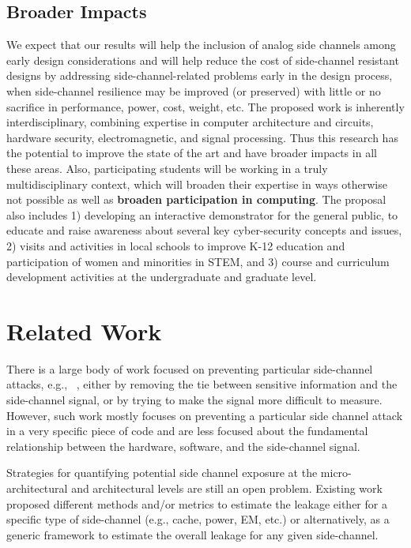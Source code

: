 \documentclass[11 pt]{article}
\begin{document}
\subsection{Broader Impacts}
We expect that our results will help the inclusion of analog side channels among early design considerations and will help reduce the cost of side-channel resistant designs by addressing side-channel-related problems early in the design process, when side-channel resilience may be improved (or preserved) with little or no sacrifice in performance, power, cost, weight, etc. The proposed work is inherently interdisciplinary, combining expertise in computer architecture and circuits, hardware security, electromagnetic, and signal processing. Thus this research has the potential to improve the state of the art and have broader impacts in all these areas. Also, participating students will be working in a truly multidisciplinary context, which will broaden their expertise in ways otherwise not possible as well as {\bf broaden participation in computing}. The proposal also includes 1) developing an interactive demonstrator for the general public, to educate and raise awareness about several key cyber-security concepts and issues, 2) visits and activities in local schools to improve K-12 education and participation of women and minorities in STEM, and 3) course and curriculum development activities at the undergraduate and graduate level.
\section{Related Work}
There is a large body of work focused on preventing particular side-channel attacks, e.g., ~\cite{Backes:2010:ASA:1929820.1929847,Nazari:2017:EED:3079856.3080223,Demme:2013:FOM:2485922.2485970,Han:2017:WMB:3133956.3134081,Liu:2016:CET:2976749.2978299,6987331,He:2017:SYC:3123939.3124546,217605,Monjur21}, either by removing the tie between sensitive information and the side-channel signal, or by
trying to make the signal more difficult to measure. However, such work mostly focuses on preventing a particular side
channel attack in a very specific piece of code and are less focused about the fundamental relationship between the hardware, software, and the side-channel signal.

Strategies for quantifying potential side channel exposure at the micro-architectural and architectural levels are still
an open problem. Existing work proposed different methods and/or metrics to estimate the leakage either for a specific type of side-channel (e.g., cache, power, EM, etc.) or alternatively, as a generic framework to estimate the overall leakage for any given side-channel.
\end{document}
